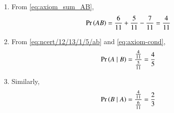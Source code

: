 \begin{enumerate}
	\item  From
\eqref{eq:axiom_sum_AB},
\begin{align}
	\pr{AB} = \frac{6}{11} + \frac{5}{11} - \frac{7}{11}
 = \frac{4}{11}
\label{eq:ncert/12/13/1/5/ab}
\end{align}
	\item From
\eqref{eq:ncert/12/13/1/5/ab}
and 
\eqref{eq:axiom-cond},
\begin{align}
	\Pr\left(A \mid B\right) = \frac{\frac{4}{11}}{\frac{5}{11}}
 = \frac{4}{5}
\end{align}
	\item Similarly,
\begin{align}
	\Pr\left(B \mid A\right) = \frac{\frac{4}{11}}{\frac{6}{11}}
	 = \frac{2}{3}
\end{align}
\end{enumerate}

